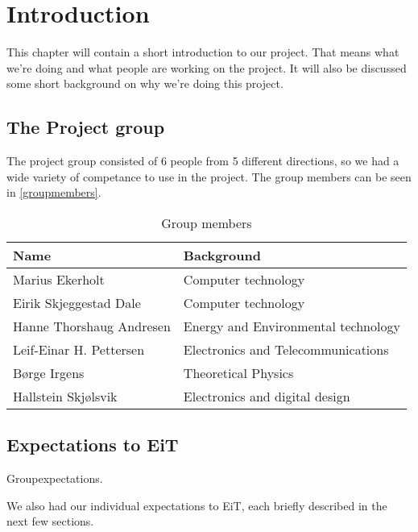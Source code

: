 \chapter{Introduction}
\label{chap:introduction}
This chapter will contain a short introduction to our project. That means what we're doing and what people are working on the project. It will also be discussed some short background on why we're doing this project.
\section{The Project group}
The project group consisted of 6 people from 5 different directions, so we had a wide variety of competance to use in the project. The group members can be seen in \autoref{groupmembers}.
\begin{table}
	\begin{center}
		\begin{tabular}{|p{4cm}|p{7cm}|}   
			\hline      
			\bf{Name} & \bf{Background} \\ 
			\hline
			Marius Ekerholt & Computer technology\\     
			\hline
			Eirik Skjeggestad Dale & Computer technology\\     
			\hline
			Hanne Thorshaug Andresen & Energy and Environmental technology\\     
			\hline
			Leif-Einar H. Pettersen & Electronics and Telecommunications\\     
			\hline
			Børge Irgens & Theoretical Physics\\     
			\hline
			Hallstein Skjølsvik & Electronics and digital design\\     
			\hline
		 \end{tabular}
	\end{center}
	\caption{Group members}
	\label{tab:groupmembers}
\end{table}

\section{Expectations to EiT}
Groupexpectations.

We also had our individual expectations to EiT, each briefly described in the next few sections.


